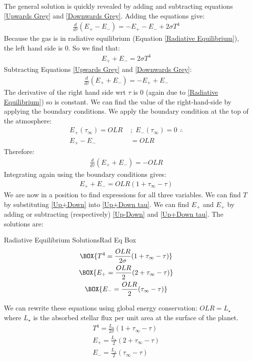 The general solution is quickly revealed by adding and subtracting equations \ref{Upwards Grey} and \ref{Downwards Grey}. Adding the equations give:
\begin{align*}
    \frac{d}{d\tau}(E_+-E_-)=-E_+-E_-+2\sigma T^4
\end{align*}
Because the gas is in radiative equilibrium (Equation \ref{Radiative Equilibrium}), the left hand side is $0$. So we find that:
\begin{align}\label{Up+Down}
    E_++E_-=2\sigma T^4
\end{align}
Subtracting Equations \ref{Upwards Grey} and \ref{Downwards Grey}:
\begin{align*}
    \frac{d}{d\tau}(E_++E_-)=-E_++E_-
\end{align*}
The derivative of the right hand side wrt $\tau$ is $0$ (again due to \ref{Radiative Equilibrium}) so is constant. We can find the value of the right-hand-side by applying the boundary conditions. We apply the boundary condition at the top of the atmosphere:
\begin{align}
    E_+(\tau_\infty)=OLR \,\, &;\,\,  
    E_-(\tau_\infty)=0\,\, \therefore\nonumber\\
    E_+-E_-&=OLR\label{Up-Down}
\end{align}
Therefore:
\begin{align*}
    \frac{d}{d\tau}(E_++E_-)=-OLR
\end{align*}
Integrating again using the boundary conditions gives:
\begin{align}
    E_++E_-=OLR(1+\tau_\infty-\tau)\label{Up+Down tau}
\end{align}
We are now in a position to find expressions for all three variables. We can find $T$ by substituting \ref{Up+Down} into \ref{Up+Down tau}. We can find $E_+$ and $E_+$ by adding or subtracting (respectively) \ref{Up-Down} and \ref{Up+Down tau}. The solutions are:
\begin{fact}{Radiative Equilibrium Solutions}{Rad Eq Box}\label{Rad Eq Box}
    \begin{gather}
        \label{Radiative Eq Temperature}
        \BOX{T^4=\frac{OLR}{2\sigma}(1+\tau_\infty-\tau)}\\
        \BOX{E_+=\frac{OLR}{2}(2+\tau_\infty-\tau)}\\
        \BOX{E_-=\frac{OLR}{2}(\tau_\infty-\tau)}
    \end{gather}
\end{fact}

We can rewrite these equations using global energy conservation: $OLR=L_\star$ where $L_\star$ is the absorbed stellar flux per unit area at the surface of the planet.
\begin{align}
    {T^4=\frac{L_\star}{2\sigma}(1+\tau_\infty-\tau)}\\
    {E_+=\frac{L_\star}{2}(2+\tau_\infty-\tau)}\\
    {E_-=\frac{L_\star}{2}(\tau_\infty-\tau)}
\end{align}

